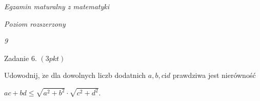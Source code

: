 \documentclass[a4paper,12pt]{article}
\begin{document}
{\it Egzamin maturalny z matematyki}

{\it Poziom rozszerzony}

{\it 9}

Zadanie 6. $(3pkt)$

Udowodnij, $\dot{\mathrm{z}}\mathrm{e}$ dla dowolnych liczb dodatnich $a, b, c \mathrm{i} d$ prawdziwa jest nierówność

$ac+bd\leq\sqrt{a^{2}+b^{2}}\cdot\sqrt{c^{2}+d^{2}}.$
\end{document}
